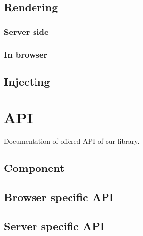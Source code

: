   \subsection{Rendering}\label{subsec:our-architecture-rendering}
  \subsubsection{Server side}\label{subsec:our-architecture-rendering-server}
  \subsubsection{In browser}\label{subsec:our-architecture-rendering-browser}
  \subsection{Injecting}\label{subsec:our-architecture-injecting}

\section{API}\label{sec:our-api}

  Documentation of offered API of our library.

  \subsection{Component}\label{subsec:our-api-component}
  \subsection{Browser specific API}\label{subsec:our-api-browser}
  \subsection{Server specific API}\label{subsec:our-api-server}
